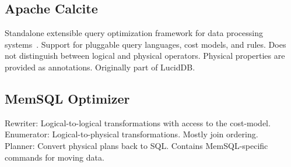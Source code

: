 \documentclass[11pt]{article}
\begin{document}
\subsection*{Apache Calcite}
Standalone extensible query optimization framework for data processing systems~\cite{Begoli2018}. Support for pluggable query languages, cost models, and rules. Does not distinguish between logical and physical operators. Physical properties are provided as annotations. Originally part of LucidDB.

\subsection*{MemSQL Optimizer}
Rewriter: Logical-to-logical transformations with access to the cost-model.\\
Enumerator: Logical-to-physical transformations. Mostly join ordering.\\
Planner: Convert physical plans back to SQL. Contains MemSQL-specific commands for moving data.

\newpage


\end{document}
